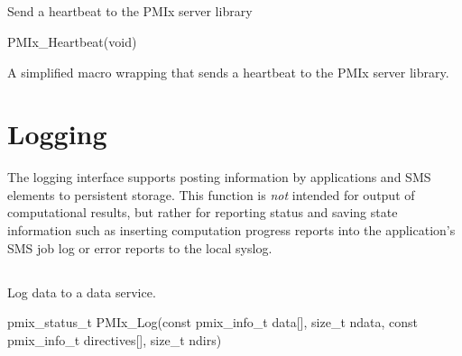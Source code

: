 \subsection{}

\summary

Send a heartbeat to the \ac{PMIx} server library

\format

\cspecificstart
\begin{codepar}
PMIx_Heartbeat(void)
\end{codepar}
\cspecificend


\descr

A simplified macro wrapping  that sends a heartbeat to the \ac{PMIx} server library.


\section{Logging}
\label{chap:api_job_mgmt:logging}

The logging interface supports posting information by applications and SMS elements to persistent storage. This function is \textit{not} intended for output of computational results, but rather for reporting status and saving state information such as inserting computation progress reports into the application's \ac{SMS} job log or error reports to the local syslog.

\subsection{}

\summary

Log data to a data service.

\format

\cspecificstart
\begin{codepar}
pmix_status_t
PMIx_Log(const pmix_info_t data[], size_t ndata,
         const pmix_info_t directives[], size_t ndirs)
\end{codepar}
\cspecificend

\begin{arglist}
\end{arglist}

